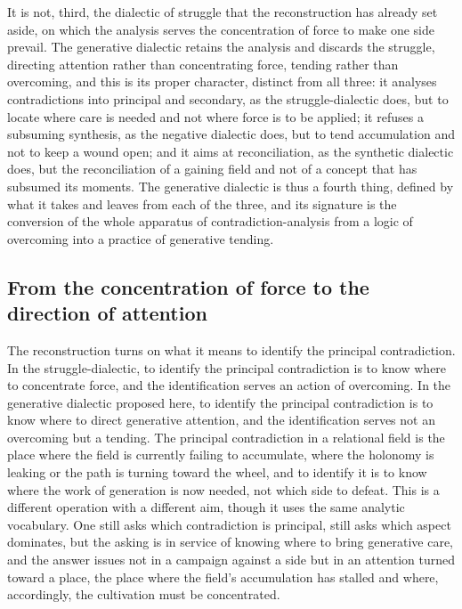 It is not, third, the dialectic of struggle that the reconstruction has already set aside, on which the analysis serves the concentration of force to make one side prevail. The generative dialectic retains the analysis and discards the struggle, directing attention rather than concentrating force, tending rather than overcoming, and this is its proper character, distinct from all three: it analyses contradictions into principal and secondary, as the struggle-dialectic does, but to locate where care is needed and not where force is to be applied; it refuses a subsuming synthesis, as the negative dialectic does, but to tend accumulation and not to keep a wound open; and it aims at reconciliation, as the synthetic dialectic does, but the reconciliation of a gaining field and not of a concept that has subsumed its moments. The generative dialectic is thus a fourth thing, defined by what it takes and leaves from each of the three, and its signature is the conversion of the whole apparatus of contradiction-analysis from a logic of overcoming into a practice of generative tending.

\subsection{From the concentration of force to the direction of attention}
\label{p22:sub:method-attention}

The reconstruction turns on what it means to identify the principal contradiction. In the struggle-dialectic, to identify the principal contradiction is to know where to concentrate force, and the identification serves an action of overcoming. In the generative dialectic proposed here, to identify the principal contradiction is to know where to direct generative attention, and the identification serves not an overcoming but a tending. The principal contradiction in a relational field is the place where the field is currently failing to accumulate, where the holonomy is leaking or the path is turning toward the wheel, and to identify it is to know where the work of generation is now needed, not which side to defeat. This is a different operation with a different aim, though it uses the same analytic vocabulary. One still asks which contradiction is principal, still asks which aspect dominates, but the asking is in service of knowing where to bring generative care, and the answer issues not in a campaign against a side but in an attention turned toward a place, the place where the field's accumulation has stalled and where, accordingly, the cultivation must be concentrated.

